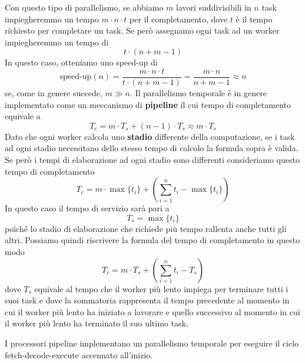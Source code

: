 Con questo tipo di parallelismo, se abbiamo $m$ lavori suddivisibili in $n$ task impiegheremmo un
tempo $m \cdot n \cdot t$ per il completamento, dove $t$ è il tempo richiesto per completare un
task. Se però assegnamo ogni task ad un worker impiegheremmo un tempo di
\[ t \cdot (n + m - 1) \]
In questo caso, otteniamo uno speed-up di
\[
	\text{speed-up} (n) = \frac{m \cdot n \cdot t}{t \cdot (n + m - 1)}
	= \frac{m \cdot n}{n + m - 1} \approx n
\]
se, come in genere succede, $m \gg n$. Il parallelismo temporale è in genere implementato come un
meccanismo di \textbf{pipeline} il cui tempo di completamento equivale a
\[ T_c = m \cdot T_s + (n - 1) \cdot T_s \approx m \cdot T_s \]
Dato che ogni worker calcola uno \textbf{stadio} differente della computazione, se i task ad ogni
stadio necessitano dello stesso tempo di calcolo la formula sopra è valida. Se però i tempi di
elaborazione ad ogni stadio sono differenti consideriamo questo tempo di completamento
\[ T_c = m \cdot \max \{ t_i \} + \left( \sum_{i=1}^n t_i - \max \{ t_i \} \right) \]
In questo caso il tempo di servizio sarà pari a
\[ T_s = \max \{ t_i \} \]
poiché lo stadio di elaborazione che richiede più tempo rallenta anche tutti gli altri. Possiamo
quindi riscrivere la formula del tempo di completamento in questo modo
\[ T_c = m \cdot T_s + \left( \sum_{i=1}^n t_i - T_s \right) \]
dove $T_s$ equivale al tempo che il worker più lento impiega per terminare tutti i suoi task e dove
la sommatoria rappresenta il tempo precedente al momento in cui il worker più lento ha iniziato a
lavorare e quello successivo al momento in cui il worker più lento ha terminato il suo ultimo task.

I processori pipeline implementano un parallelismo temporale per eseguire il ciclo
fetch-decode-execute accennato all'inizio.
